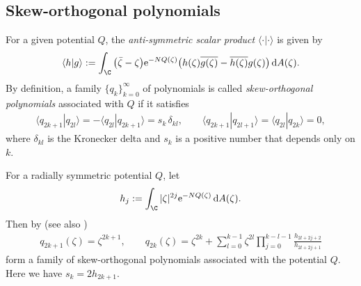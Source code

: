 \subsection{Skew-orthogonal polynomials}
For a given potential $Q$, the \textit{anti-symmetric scalar product} $\langle \cdot | \cdot \rangle$ is given by
\begin{gather*}
	\langle h|g \rangle:= \int_\C \big( \bar{\zeta}-\zeta \big) {\rm e}^{-N Q(\zeta) } \big( h(\zeta) \overline{g(\zeta)}-\overline{h(\zeta)}g(\zeta) \big) \, {\rm d}A(\zeta).
\end{gather*}
By definition, a family $\{ q_k \}_{k=0}^\infty$ of polynomials is called
\textit{skew-orthogonal polynomials} associated with $Q$ if it satisfies
\begin{gather*}
	\langle q_{2k+1} | q_{2l} \rangle=-\langle q_{2l} | q_{2k+1} \rangle =s_k \, \delta_{kl}, \qquad \langle q_{2k+1} | q_{2l+1} \rangle=\langle q_{2l} | q_{2k} \rangle=0,
\end{gather*}
where $\delta_{kl}$ is the Kronecker delta and $s_k$ is a positive number that depends only on $k$.

For a radially symmetric potential $Q$, let
\begin{gather*}
	h_j:=\int_\C |\zeta|^{2j} {\rm e}^{-N Q(\zeta)} \, {\rm d}A(\zeta).
\end{gather*}
Then by \cite[Theorem 3.1]{akemann2021skew} (see also \cite[p.~7]{MR3066113})
\begin{gather} \label{skew op_rad}
	q_{2k+1}(\zeta)=\zeta^{2k+1}, \qquad q_{2k}(\zeta)=\zeta^{2k}+\sum_{l=0}^{k-1} \zeta^{2l} \prod_{j=0}^{k-l-1} \frac{h_{2l+2j+2} }{ h_{2l+2j+1} }
\end{gather}
form a family of skew-orthogonal polynomials associated with the potential $Q$. Here we have $s_k=2h_{2k+1}.$

